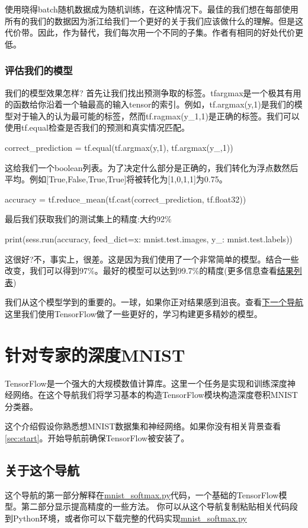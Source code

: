 使用晓得batch随机数据成为随机训练，在这种情况下。最佳的我们想在每部使用所有的我们的数据因为浙江给我们一个更好的关于我们应该做什么的理解。但是这代价带。因此，作为替代，我们每次用一个不同的子集。作者有相同的好处代价更低。
\subsubsection{评估我们的模型}
我们的模型效果怎样?
首先让我们找出预测争取的标签。tfargmax是一个极其有用的函数给你沿着一个轴最高的输入tensor的索引。例如，tf.argmax(y,1)是我们的模型对于输入的认为最可能的标签，然而tf.ragmax(y\_1,1)是正确的标签。我们可以使用tf.equal检查是否我们的预测和真实情况匹配。
\begin{pythoncode}
correct_prediction = tf.equal(tf.argmax(y,1), tf.argmax(y_,1))
\end{pythoncode}
这给我们一个boolean列表。为了决定什么部分是正确的，我们转化为浮点数然后平均。例如[True,False,True,True]将被转化为[1,0,1,1]为0.75。
\begin{pythoncode}
accuracy = tf.reduce_mean(tf.cast(correct_prediction, tf.float32))
\end{pythoncode}
最后我们获取我们的测试集上的精度:大约92\%
\begin{pythoncode}
print(sess.run(accuracy, feed_dict={x: mnist.test.images, y_: mnist.test.labels}))
\end{pythoncode}
这很好?不，事实上，很差。这是因为我们使用了一个非常简单的模型。结合一些改变，我们可以得到97\%。最好的模型可以达到99.7\%的精度(更多信息查看\href{https://rodrigob.github.io/are_we_there_yet/build/classification_datasets_results}{结果列表})

我们从这个模型学到的重要的。一球，如果你正对结果感到沮丧。查看\href{https://www.tensorflow.org/get_started/mnist/pros}{下一个导航}这里我们使用TensorFlow做了一些更好的，学习构建更多精妙的模型。
\section{针对专家的深度MNIST}
TensorFlow是一个强大的大规模数值计算库。这里一个任务是实现和训练深度神经网络。在这个导航我们将学习基本的构造TensorFlow模块构造深度卷积MNIST分类器。

这个介绍假设你熟悉想MNIST数据集和神经网络。如果你没有相关背景查看\ref{sec:start}。开始导航前确保TensorFlow被安装了。

\subsection{关于这个导航}
这个导航的第一部分解释在\href{https://www.github.com/tensorflow/tensorflow/blob/r1.4/tensorflow/examples/tutorials/mnist/mnist_softmax.py}{mnist\_softmax.py}代码，一个基础的TensorFlow模型。第二部分显示提高精度的一些方法。
你可以从这个导航复制粘贴相关代码段到Python环境，或者你可以下载完整的代码实现\href{https://www.github.com/tensorflow/tensorflow/blob/r1.4/tensorflow/examples/tutorials/mnist/mnist_softmax.py}{mnist\_softmax.py}

